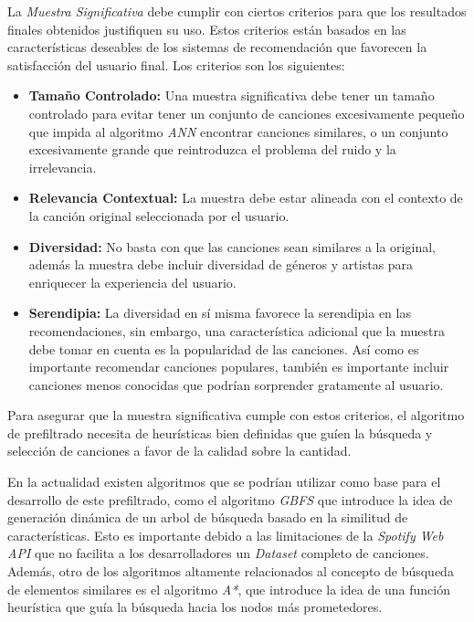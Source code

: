 La \textit{Muestra Significativa} debe cumplir con ciertos criterios para que los resultados finales obtenidos justifiquen su uso. Estos criterios están basados en las características deseables de los sistemas de recomendación que favorecen la satisfacción del usuario final. Los criterios son los siguientes:

\begin{itemize}
    \item \textbf{Tamaño Controlado: } Una muestra significativa debe tener un tamaño controlado para evitar tener un conjunto de canciones excesivamente pequeño que impida al algoritmo \textit{ANN} encontrar canciones similares, o un conjunto excesivamente grande que reintroduzca el problema del ruido y la irrelevancia.
    \item \textbf{Relevancia Contextual: } La muestra debe estar alineada con el contexto de la canción original seleccionada por el usuario. 
    \item \textbf{Diversidad: } No basta con que las canciones sean similares a la original, además la muestra debe incluir diversidad de géneros y artistas para enriquecer la experiencia del usuario.
    \item \textbf{Serendipia: } La diversidad en sí misma favorece la serendipia en las recomendaciones, sin embargo, una característica adicional que la muestra debe tomar en cuenta es la popularidad de las canciones. Así como es importante recomendar canciones populares, también es importante incluir canciones menos conocidas que podrían sorprender gratamente al usuario.
\end{itemize}

Para asegurar que la muestra significativa cumple con estos criterios, el algoritmo de prefiltrado necesita de heurísticas bien definidas que guíen la búsqueda y selección de canciones a favor de la calidad sobre la cantidad. 

En la actualidad existen algoritmos que se podrían utilizar como base para el desarrollo de este prefiltrado, como el algoritmo \textit{GBFS} que introduce la idea de generación dinámica de un arbol de búsqueda basado en la similitud de características. Esto es importante debido a las limitaciones de la \textit{Spotify Web API} que no facilita a los desarrolladores un \textit{Dataset} completo de canciones. Además, otro de los algoritmos altamente relacionados al concepto de búsqueda de elementos similares es el algoritmo \textit{A*}, que introduce la idea de una función heurística que guía la búsqueda hacia los nodos más prometedores. 

